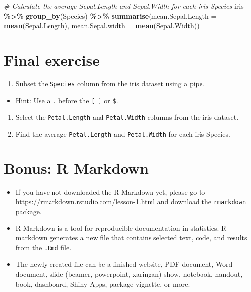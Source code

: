 \documentclass[
]{book}
\newenvironment{Shaded}{\begin{snugshade}}{\end{snugshade}}
\newcommand{\AttributeTok}[1]{\textcolor[rgb]{0.13,0.29,0.53}{#1}}
\newcommand{\CommentTok}[1]{\textcolor[rgb]{0.56,0.35,0.01}{\textit{#1}}}
\newcommand{\FunctionTok}[1]{\textcolor[rgb]{0.13,0.29,0.53}{\textbf{#1}}}
\newcommand{\NormalTok}[1]{#1}
\newcommand{\SpecialCharTok}[1]{\textcolor[rgb]{0.81,0.36,0.00}{\textbf{#1}}}
\providecommand{\tightlist}{%
  \setlength{\itemsep}{0pt}\setlength{\parskip}{0pt}}
\begin{document}
\begin{Shaded}
\begin{Highlighting}[]
\CommentTok{\# Calculate the average Sepal.Length and Sepal.Width for each iris Species}
\NormalTok{iris }\SpecialCharTok{\%\textgreater{}\%}
  \FunctionTok{group\_by}\NormalTok{(Species) }\SpecialCharTok{\%\textgreater{}\%}
  \FunctionTok{summarise}\NormalTok{(}\AttributeTok{mean.Sepal.Length =} \FunctionTok{mean}\NormalTok{(Sepal.Length), }\AttributeTok{mean.Sepal.width =} \FunctionTok{mean}\NormalTok{(Sepal.Width))}
\end{Highlighting}
\end{Shaded}

\section{Final exercise}\label{final-exercise-1}

\begin{enumerate}
\def\labelenumi{\arabic{enumi}.}
\tightlist
\item
  Subset the \texttt{Species} column from the iris dataset using a pipe.
\end{enumerate}

\begin{itemize}
\tightlist
\item
  Hint: Use a \texttt{.} before the \texttt{{[}\ {]}} or \texttt{\$}.
\end{itemize}

\begin{enumerate}
\def\labelenumi{\arabic{enumi}.}
\setcounter{enumi}{1}
\tightlist
\item
  Select the \texttt{Petal.Length} and \texttt{Petal.Width} columns from the iris dataset.
\item
  Find the average \texttt{Petal.Length} and \texttt{Petal.Width} for each iris Species.
\end{enumerate}

\section{Bonus: R Markdown}\label{bonus-r-markdown}

\begin{itemize}
\tightlist
\item
  If you have not downloaded the R Markdown yet, please go to \url{https://rmarkdown.rstudio.com/lesson-1.html} and download the \texttt{rmarkdown} package.
\item
  R Markdown is a tool for reproducible documentation in statistics. R markdown generates a new file that contains selected text, code, and results from the \texttt{.Rmd} file.
\item
  The newly created file can be a finished website, PDF document, Word document, slide (beamer, powerpoint, xaringan) show, notebook, handout, book, dashboard, Shiny Apps, package vignette, or more.
\end{itemize}
\end{document}
